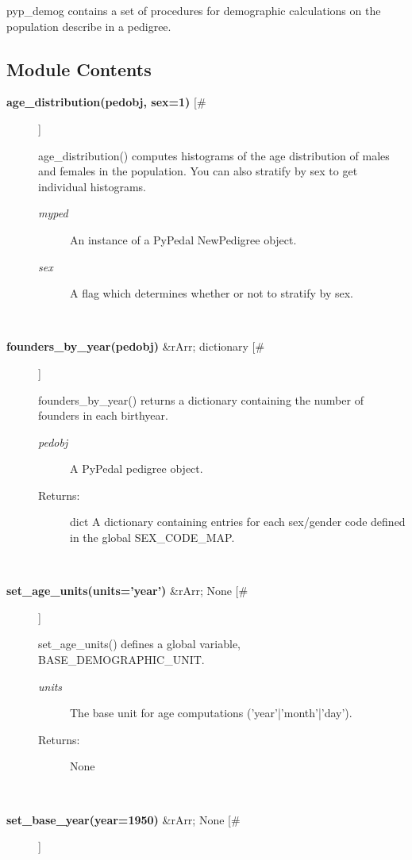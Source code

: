 

 pyp\_demog contains a set of procedures for demographic calculations on the population describe in a pedigree.
\subsection*{Module Contents}
\begin{description}
\item[\textbf{age\_distribution(pedobj, sex=1)}
 [\#]]

 age\_distribution() computes histograms of the age distribution of males and females in the population. You can also stratify by sex to get individual histograms.
\begin{description}
\item[\emph{myped}
] An instance of a PyPedal NewPedigree object.
\item[\emph{sex}
] A flag which determines whether or not to stratify by sex.

\end{description}
\\ 

\item[\textbf{founders\_by\_year(pedobj)}
 \&rArr; dictionary [\#]]

 founders\_by\_year() returns a dictionary containing the number of founders in each birthyear.
\begin{description}
\item[\emph{pedobj}
] A PyPedal pedigree object.
\item[Returns:] dict A dictionary containing entries for each sex/gender code defined in the global SEX\_CODE\_MAP.

\end{description}
\\ 

\item[\textbf{set\_age\_units(units='year')}
 \&rArr; None [\#]]

 set\_age\_units() defines a global variable, BASE\_DEMOGRAPHIC\_UNIT.
\begin{description}
\item[\emph{units}
] The base unit for age computations ('year'|'month'|'day').
\item[Returns:] None

\end{description}
\\ 

\item[\textbf{set\_base\_year(year=1950)}
 \&rArr; None [\#]]


\end{description}
